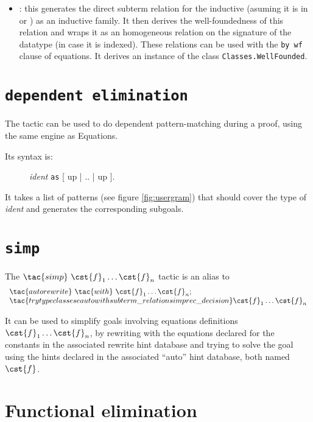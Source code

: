 \begin{itemize}
\item {}: this generates the direct subterm relation for the
  inductive (asuming it is in  or ) as an inductive family.
  It then derives the well-foundedness of this relation and wraps it
  as an homogeneous relation on the signature of the datatype (in case
  it is indexed). These relations can be used with the \texttt{by wf}
  clause of equations. It derives an instance of the class
  \texttt{Classes.WellFounded}.

\end{itemize}

\section{\texttt{dependent elimination}}

The  tactic can be used to do dependent
pattern-matching during a proof, using the same engine as Equations.

Its syntax is:
\begin{figure}[h]
   \textit{ident} \texttt{as} [ up | .. | up ].
\end{figure}

It takes a list of patterns (see figure \ref{fig:usergram}) that should cover the type of \textit{ident}
and generates the corresponding subgoals.


\section{\texttt{simp}}

The $\tac{simp}~\cst{f}_1 \ldots \cst{f}_n$ tactic is an alias to
\[\begin{array}{l}
  \tac{autorewrite}~\tac{with}~\cst{f}_1 \ldots \cst{f}_n ; \\
  \tac{try typeclasses eauto with subterm\_relation simp rec\_decision} \cst{f}_1
  \ldots \cst{f}_n
\end{array}\]

It can be used to simplify goals involving equations definitions
$\cst{f}_1 \ldots \cst{f}_n$, by rewriting with the equations declared
for the constants in the associated rewrite hint database and trying to
solve the goal using the hints declared in the associated ``auto'' hint
database, both named $\cst{f}$.

\section{Functional elimination}

